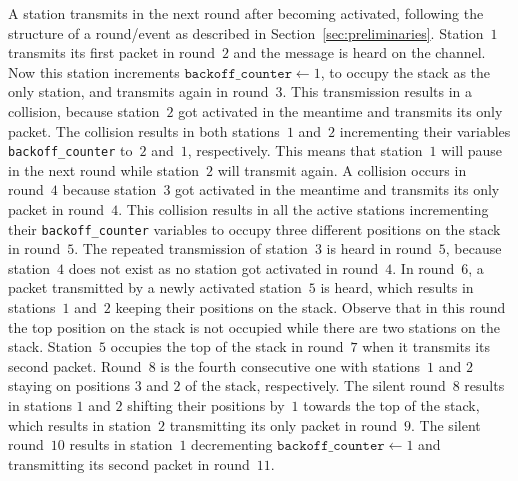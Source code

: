 \documentclass[11pt]{article}
\begin{document}
A station transmits in the next round after becoming activated, following the structure of a round/event as described in Section~\ref{sec:preliminaries}.
Station~$1$ transmits its first packet in round~$2$ and the message is heard on the channel.
Now this station increments $\texttt{backoff\_counter}\leftarrow 1$, to occupy the stack as the only station, and transmits again in round~$3$.
This transmission results in a collision, because station~$2$ got activated in the meantime and transmits its only packet.
The collision results in both stations~$1$ and~$2$ incrementing their variables \texttt{backoff\_counter} to~$2$ and~$1$, respectively.
This means that station~$1$ will pause in the next round while station~$2$ will transmit again.
A collision occurs in round~$4$ because station~$3$ got activated in the meantime and transmits its only packet in round~$4$.
This collision results in all the active stations incrementing their \texttt{backoff\_counter} variables to occupy three different positions on the stack in round~$5$.
The repeated transmission of station~$3$ is heard in round~$5$, because station~$4$ does not exist as no station got activated in round~$4$.
In round~$6$, a packet transmitted by a newly activated station~$5$ is heard, which results in stations~$1$ and~$2$ keeping their positions on the stack.
Observe that in this round the top position on the stack is not occupied while there are two stations on the stack.
Station~$5$ occupies the top of the stack in round~$7$ when it transmits its second packet.
Round~$8$ is the fourth consecutive one with stations~$1$ and $2$ staying on positions $3$ and $2$ of the stack, respectively.
The silent round~$8$ results in stations $1$ and $2$ shifting their positions by~$1$ towards the top of the stack, which results in station~$2$ transmitting its only packet in round~$9$.
The silent round~$10$ results in station~$1$ decrementing $\texttt{backoff\_counter}\leftarrow 1$ and transmitting its second packet in round~$11$.
\end{document}

